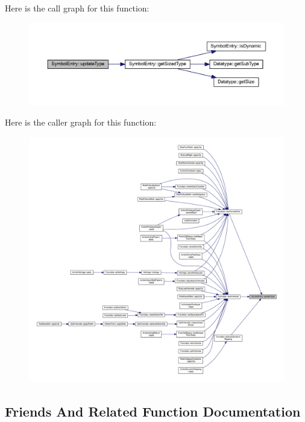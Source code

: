 Here is the call graph for this function\+:
\nopagebreak
\begin{figure}[H]
\begin{center}
\leavevmode
\includegraphics[width=350pt]{class_symbol_entry_a9a4d4c566e91765896e49a4d565e077e_cgraph}
\end{center}
\end{figure}
Here is the caller graph for this function\+:
\nopagebreak
\begin{figure}[H]
\begin{center}
\leavevmode
\includegraphics[width=350pt]{class_symbol_entry_a9a4d4c566e91765896e49a4d565e077e_icgraph}
\end{center}
\end{figure}


\subsection{Friends And Related Function Documentation}
\mbox{\label{class_symbol_entry_a921193447f6e42f596ac0a7694b02830}} 
